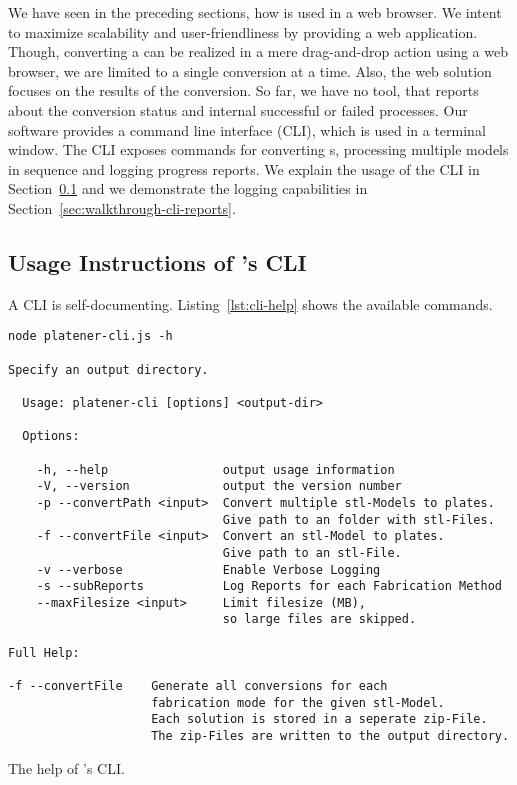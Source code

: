 \documentclass[../ClassicThesis.tex]{subfiles}
\begin{document}
We have seen in the preceding sections, how {\platener} is used in a
web browser. We intent to maximize scalability and user-friendliness
by providing a web application. Though, converting a {\threedmodel}
can be realized in a mere drag-and-drop action using a web browser, we
are limited to a single conversion at a time. Also, the web solution
focuses on the results of the conversion. So far, we have no tool,
that reports about the conversion status and internal successful or
failed processes. Our software {\platener} provides a command line
interface (CLI), which is used in a terminal window. The CLI exposes
commands for converting {\threedmodel}s, processing multiple models in
sequence and logging progress reports. We explain the usage of the CLI
in Section~\ref{sec:walkthrough-cli-usage} and we demonstrate the
logging capabilities in Section~\ref{sec:walkthrough-cli-reports}.

\subsection{Usage Instructions of {\platener}'s CLI}
\label{sec:walkthrough-cli-usage}

A CLI is self-documenting. Listing~\ref{lst:cli-help} shows the
available commands.

\begin{listing}[!h]
\begin{verbatim}
node platener-cli.js -h

Specify an output directory.

  Usage: platener-cli [options] <output-dir>

  Options:

    -h, --help                output usage information
    -V, --version             output the version number
    -p --convertPath <input>  Convert multiple stl-Models to plates.
                              Give path to an folder with stl-Files.
    -f --convertFile <input>  Convert an stl-Model to plates.
                              Give path to an stl-File.
    -v --verbose              Enable Verbose Logging
    -s --subReports           Log Reports for each Fabrication Method
    --maxFilesize <input>     Limit filesize (MB),
                              so large files are skipped.

Full Help:

-f --convertFile    Generate all conversions for each
                    fabrication mode for the given stl-Model.
                    Each solution is stored in a seperate zip-File.
                    The zip-Files are written to the output directory.
\end{verbatim}
\caption{The help of {\platener}'s CLI.}
\label{lst:cli-help}
\end{listing}
\end{document}
